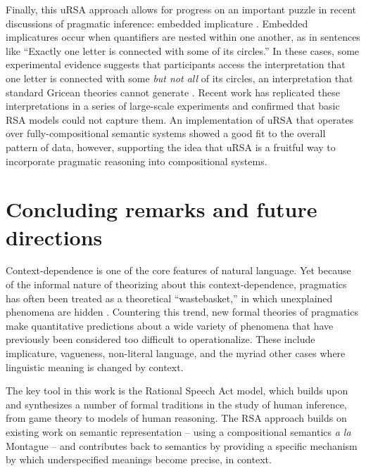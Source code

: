 \documentclass[]{elsarticle}
\begin{document}
Finally, this uRSA approach allows for progress on an important puzzle
in recent discussions of pragmatic inference: embedded implicature \citep{geurts2009,chemla2011}. Embedded
implicatures occur when quantifiers are nested within one another, as in
sentences like ``Exactly one letter is connected with some of its
circles.'' In these cases, some experimental evidence suggests that
participants access the interpretation that one letter is connected with
some \emph{but not all} of its circles, an interpretation that standard
Gricean theories cannot generate \citep{chemla2011}. 
Recent work \citep{potts2015} has replicated these interpretations in a series of large-scale
experiments and confirmed that basic RSA models could not capture them.
An implementation of uRSA that operates over fully-compositional
semantic systems \citep{bergen2016,potts2015} showed a good fit to the overall pattern of data, however, supporting the idea that uRSA is a fruitful way to incorporate pragmatic reasoning into compositional systems.

\section{Concluding remarks and future directions}\label{conclusions-and-future-directions}

Context-dependence is one of the core features of natural language. Yet
because of the informal nature of theorizing about this context-dependence,
pragmatics has often been treated as a theoretical ``wastebasket,'' in
which unexplained phenomena are hidden \citep{bar-hillel1971}. Countering this trend, new formal theories of pragmatics make quantitative
predictions about a wide variety of phenomena that have previously been
considered too difficult to operationalize. These include implicature,
vagueness, non-literal language, and the myriad other cases where
linguistic meaning is changed by context.

The key tool in this work is the Rational Speech Act model, which builds upon and synthesizes a
number of formal traditions in the study of human inference, from game
theory to models of human reasoning. The RSA approach builds on existing
work on semantic representation -- using a compositional semantics
\emph{a la} Montague \citep{dowty2012} -- and contributes back to semantics by providing a
specific mechanism by which underspecified meanings become precise, in
context.

\end{document}
